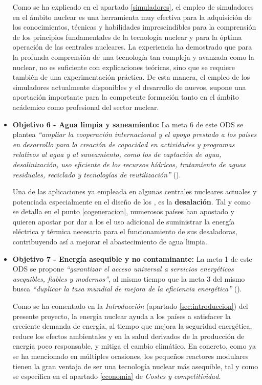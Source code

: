 \begin{itemize}
    Como se ha explicado en el apartado \ref{simuladores}, el empleo de simuladores en el ámbito nuclear es una herramienta muy efectiva para la adquisición de los conocimientos, técnicas y habilidades imprescindibles para la comprensión de los principios fundamentales de la tecnología nuclear y para la óptima operación de las centrales nucleares. La experiencia ha demostrado que para la profunda comprensión de una tecnología tan compleja y avanzada como la nuclear, no es suficiente con explicaciones teóricas, sino que se requiere también de una experimentación práctica.  De esta manera, el empleo de los simuladores actualmente disponibles y el desarrollo de nuevos, supone una aportación importante para la competente formación tanto en el ámbito acádemico como profesional del sector nuclear.

    \item \textbf{Objetivo 6 - Agua limpia y saneamiento:} La meta 6 de este ODS se plantea \textit{``ampliar la cooperación internacional y el apoyo prestado a los países en desarrollo para la creación de capacidad en actividades y programas relativos al agua y al saneamiento, como los de captación de agua, desalinización, uso eficiente de los recursos hídricos, tratamiento de aguas residuales, reciclado y tecnologías de reutilización''} (\cite{ODS}).
    
    Una de las aplicaciones ya empleada en algunas centrales nucleares actuales y potenciada especialmente en el diseño de los , es la \textbf{desalación}. Tal y como se detalla en el punto \ref{cogeneracion}, numerosos países han apostado y quieren apostar por dar a los  el uso adicional de suministrar la energía eléctrica y térmica necesaria para el funcionamiento de sus desaladoras, contribuyendo así a mejorar el abastecimiento de agua limpia.

    \item \textbf{Objetivo 7 - Energía asequible y no contaminante:} La meta 1 de este ODS se propone \textit{``garantizar el acceso universal a servicios energéticos asequibles, fiables y modernos''}, al mismo tiempo que la meta 3 del mismo busca \textit{``duplicar la tasa mundial de mejora de la eficiencia energética''} (\cite{ODS}).
    
    Como se ha comentado en la \textit{Introducción} (apartado \ref{sec:introduccion}) del presente proyecto, la energía nuclear ayuda a los países a satisfacer la creciente demanda de energía, al tiempo que mejora la seguridad energética, reduce los efectos ambientales y en la salud derivados de la producción de energía poco responsable, y mitiga el cambio climático. En concreto, como ya se ha mencionado en múltiples ocasiones, los pequeños reactores modulares tienen la gran ventaja de ser una tecnología nuclear más asequible, tal y como se específica en el apartado \ref{economia} de \textit{Costes y competitividad}.


\end{itemize}
